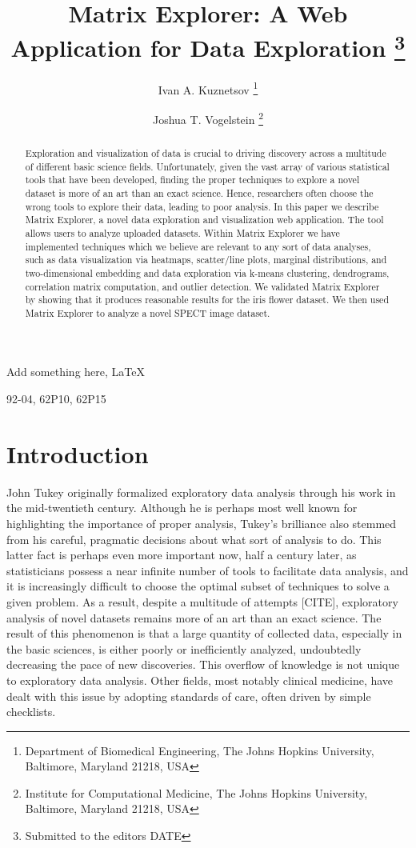 \documentclass[review]{siamart0516}
\title{Matrix Explorer: A Web Application for Data Exploration%
	\thanks{Submitted to the editors DATE\funding{This work is graciously supported by the Defense Advanced Research Projects Agency (DARPA) SIMPLEX program through SPAWAR contract N66001-15-C-4041 and DARPA GRAPHS N66001-14-1-4028}}
}
\author{Ivan A. Kuznetsov%
	\thanks{Department of Biomedical Engineering, The Johns Hopkins University, Baltimore, Maryland 21218, USA}%
	\and
	Joshua T. Vogelstein%
	\footnotemark[2]
	\thanks{Institute for Computational Medicine, The Johns Hopkins University, Baltimore, Maryland 21218, USA}
}
\begin{document}
\maketitle

\begin{abstract}
Exploration and visualization of data is crucial to driving discovery across a multitude of different basic science fields. Unfortunately, given the vast array of various statistical tools that have been developed, finding the proper techniques to explore a novel dataset is more of an art than an exact science. Hence, researchers often choose the wrong tools to explore their data, leading to poor analysis. In this paper we describe Matrix Explorer, a novel data exploration and visualization web application. The tool allows users to analyze uploaded datasets. Within Matrix Explorer we have implemented techniques which we believe are relevant to any sort of data analyses, such as data visualization via heatmaps, scatter/line plots, marginal distributions, and two-dimensional embedding and data exploration via k-means clustering, dendrograms, correlation matrix computation, and outlier detection. We validated Matrix Explorer by showing that it produces reasonable results for the iris flower dataset. We then used Matrix Explorer to analyze a novel SPECT image dataset.
\end{abstract}

\begin{keywords}
	Add something here, \LaTeX
\end{keywords}

\begin{AMS}
	92-04, 62P10, 62P15
\end{AMS}

\section{Introduction}
\label{sec:intro}

John Tukey originally formalized exploratory data analysis through his work in the mid-twentieth century. Although he is perhaps most well known for highlighting the importance of proper analysis, Tukey's brilliance also stemmed from his careful, pragmatic decisions about what sort of analysis to do. This latter fact is perhaps even more important now, half a century later, as statisticians possess a near infinite number of tools to facilitate data analysis, and it is increasingly difficult to choose the optimal subset of techniques to solve a given problem. As a result, despite a multitude of attempts [CITE], exploratory analysis of novel datasets remains more of an art than an exact science. The result of this phenomenon is that a large quantity of collected data, especially in the basic sciences, is either poorly or inefficiently analyzed, undoubtedly decreasing the pace of new discoveries. This overflow of knowledge is not unique to exploratory data analysis. Other fields, most notably clinical medicine, have dealt with this issue by adopting standards of care, often driven by simple checklists. 
\end{document}
